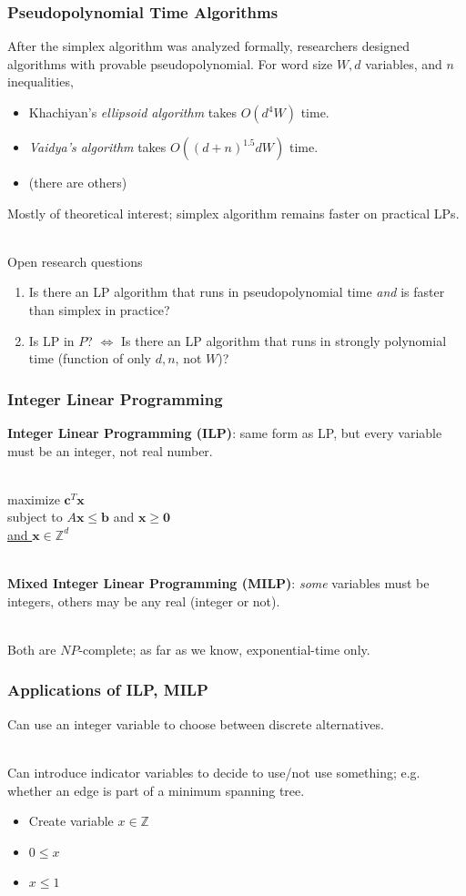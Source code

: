 \documentclass{beamer}
\newcommand{\stanza}{ \\~\ }
\begin{document}
\begin{frame} \frametitle{Pseudopolynomial Time Algorithms}
After the simplex algorithm was analyzed formally, researchers designed algorithms with provable pseudopolynomial. For word size $W, d$ variables, and $n$ inequalities,
\begin{itemize}
  \item Khachiyan's \emph{ellipsoid algorithm} takes $O(d^4 W)$ time.
  \item \emph{Vaidya's algorithm} takes $O((d+n)^{1.5} d W)$ time.
  \item (there are others)
\end{itemize}

Mostly of theoretical interest; simplex algorithm remains faster on practical LPs. \stanza

Open research questions
\begin{enumerate}
  \item Is there an LP algorithm that runs in pseudopolynomial time \emph{and} is faster than simplex in practice?
  \item Is LP in $P$? $\Leftrightarrow$ Is there an LP algorithm that runs in strongly polynomial time (function of only $d, n$, not $W$)?
\end{enumerate}
\end{frame}

\begin{frame} \frametitle{Integer Linear Programming}
\textbf{Integer Linear Programming (ILP)}: same form as LP, but every variable must
be an integer, not real number. \stanza

maximize $\mathbf{c}^T \mathbf{x}$ \\
subject to $A \mathbf{x} \leq \mathbf{b}$ and $\mathbf{x} \geq \mathbf{0}$ \\
\underline{and $\mathbf{x} \in \mathbb{Z}^d$} \stanza

\textbf{Mixed Integer Linear Programming (MILP)}: \emph{some} variables must be
integers, others may be any real (integer or not). \stanza

Both are $NP$-complete; as far as we know, exponential-time only.
\end{frame}

\begin{frame} \frametitle{Applications of ILP, MILP}
Can use an integer variable to choose between discrete alternatives. \stanza

Can introduce indicator variables to decide to use/not use something; e.g.
whether an edge is part of a minimum spanning tree.
\begin{itemize}
  \item Create variable $x \in \mathbb{Z}$
  \item $0 \leq x$
  \item $x \leq 1$
\end{itemize}
\end{frame}
\end{document}
